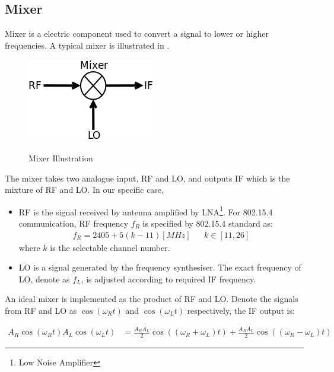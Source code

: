 \subsection{Mixer}

Mixer is a electric component used to convert a signal to lower or higher frequencies. A typical mixer is illustrated in .

\begin{figure}
\center
\caption{Mixer Illustration}
\includegraphics[width=0.5\linewidth]{figures/mixer.png}
\label{mixer}
\end{figure}

The mixer takes two analogue input, RF and LO, and outputs IF which is the mixture of RF and LO. In our specific case,
\begin{itemize}
\item RF is the signal received by antenna amplified by LNA\footnote{Low Noise Amplifier}. For 802.15.4 communication, RF frequency $f_{R}$ is specified by 802.15.4 standard\cite{802154_Standard} as:
\begin{eqnarray}
f_{R} = 2405 + 5(k-11) [MHz] && k \in [11, 26]
\end{eqnarray}
where $k$ is the selectable channel number.

\item LO is a signal generated by the frequency synthesiser. The exact frequency of LO, denote as $f_{L}$, is adjusted according to required IF frequency.
\end{itemize}

An ideal mixer is implemented as the product of RF and LO. Denote the signals from RF and LO as $\cos(\omega_{R}t)$ and $\cos(\omega_{L}t)$ respectively, the IF output is:

\begin{equation} \label{IF}
\begin{split}
A_{R}\cos(\omega_{R}t)A_{L}\cos(\omega_{L}t) &= {\frac{A_{R}A_{L}}{2}}\cos((\omega_{R} + \omega_{L})t) + {\frac{A_{R}A_{L}}{2}}\cos((\omega_{R} - \omega_{L})t)
\end{split}
\end{equation} 

